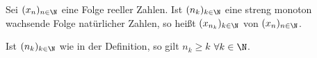 Sei $(x_n)_{n \in \N}$ eine Folge reeller Zahlen. Ist $(n_k)_{k \in \N}$ eine streng monoton wachsende Folge natürlicher Zahlen, so heißt $(x_{n_k})_{k \in \N}$  von $(x_n)_{n \in \N}$.

Ist $(n_k)_{k \in \N}$ wie in der Definition, so gilt $n_k \geq k$ $\forall k \in \N$.